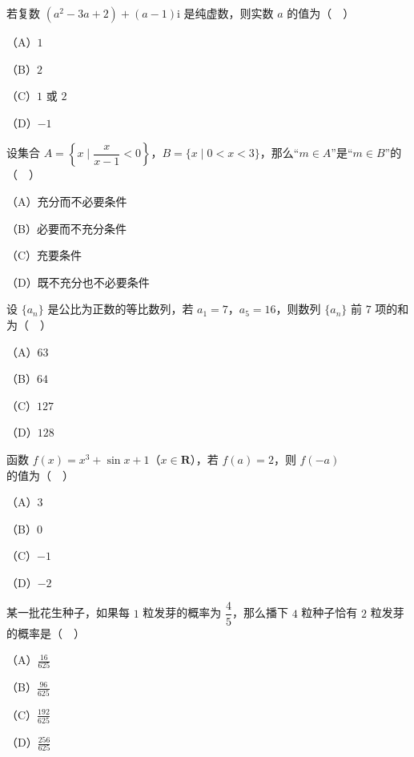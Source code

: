 


\begin{question}
若复数 $(a^2-3a+2)+(a-1)\mathrm i$ 是纯虚数，则实数 $a$ 的值为（　）

（A）$1$

（B）$2$

（C）$1$ 或 $2$

（D）$-1$

\end{question}
\begin{question}
设集合 $A=\left\{x\mid \dfrac{x}{x-1}<0\right\}$，$B=\{x\mid 0<x<3\}$，那么“$m\in A$”是“$m\in B$”的（　）

（A）充分而不必要条件

（B）必要而不充分条件

（C）充要条件

（D）既不充分也不必要条件

\end{question}
\begin{question}
设 $\{a_n\}$ 是公比为正数的等比数列，若 $a_1=7$，$a_5=16$，则数列 $\{a_n\}$ 前 $7$ 项的和为（　）

（A）$63$

（B）$64$

（C）$127$

（D）$128$

\end{question}
\begin{question}
函数 $f(x)=x^3+\sin x+1$（$x\in\mathbf R$），若 $f(a)=2$，则 $f(-a)$ 的值为（　）

（A）$3$

（B）$0$

（C）$-1$

（D）$-2$

\end{question}
\begin{question}
某一批花生种子，如果每 $1$ 粒发芽的概率为 $\dfrac45$，那么播下 $4$ 粒种子恰有 $2$ 粒发芽的概率是（　）

（A）$\frac{16}{625}$

（B）$\frac{96}{625}$

（C）$\frac{192}{625}$

（D）$\frac{256}{625}$

\Needspace{0.4\textheight}
\end{question}
